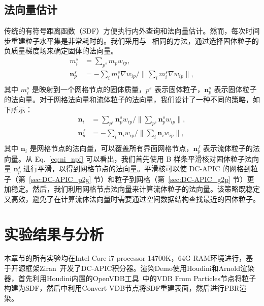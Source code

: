 \subsection{法向量估计}
传统的有符号距离函数（SDF）方便执行内外查询和法向量估计。然而，每次时间步重建粒子水平集是非常耗时的。我们采用与~\cite{fang2020iq} 相同的方法，通过选择固体粒子的负质量梯度场来确定固体的法向量。
\begin{equation}
\begin{aligned}
m_i^s &= \sum_{p^s} m_p w_{ip},\\
\mathbf{n}_p^s &= -\sum_i m_i^s \nabla w_{ip} / \| \sum_i m_i^s \nabla w_{ip} \| ,\\
\end{aligned}
\end{equation}
其中 $m_i^s$ 是映射到一个网格节点的固体质量，$p^s$ 表示固体粒子，$\mathbf{n}_p^s$ 表示固体粒子的法向量。对于网格法向量和流体粒子的法向量，我们设计了一种不同的策略，如下所示：
\begin{equation}
\label{eq:ni_npf}
\begin{aligned}
\mathbf{n}_i &= \sum_{p^s} \mathbf{n}_p^s w_{ip} / \| \sum_{p^s} \mathbf{n}_p^s w_{ip} \| ,\\
\mathbf{n}_p^f &= -\sum_i \mathbf{n}_i w_{ip} / \| \sum_i \mathbf{n}_i w_{ip} \|,\\
\end{aligned}
\end{equation}
其中 $\mathbf{n}_i$ 是网格节点的法向量，可以覆盖所有界面网格节点，$\mathbf{n}_p^f$ 表示流体粒子的法向量。从 Eq.~\eqref{eq:ni_npf} 可以看出，我们首先使用 B 样条平滑核对固体粒子法向量 $\mathbf{n}_p^s$ 进行平滑，以得到网格节点的法向量。平滑核可以使 DC-APIC 的网格到粒子（第~\ref{sec:DC-APIC_p2g} 节）和粒子到网格（第~\ref{sec:DC-APIC_g2p} 节）更加稳定。然后，我们利用网格节点法向量来计算流体粒子的法向量。该策略既稳定又高效，避免了在计算流体法向量时需要通过空间数据结构查找最近的固体粒子。


\section{实验结果与分析}
本章节的所有实验均在Intel Core i7 processor 14700K，64G RAM环境进行，基于开源框架Ziran~\cite{fang2020iq}开发了DC-APIC积分器。渲染Demo使用Houdini和Arnold渲染器，首先利用Houdini内置的OpenVDB工具~\cite{museth2013vdb}中的VDB From Particles节点将粒子构建为SDF，然后中利用Convert VDB节点将SDF重建表面，然后进行PBR渲染。

